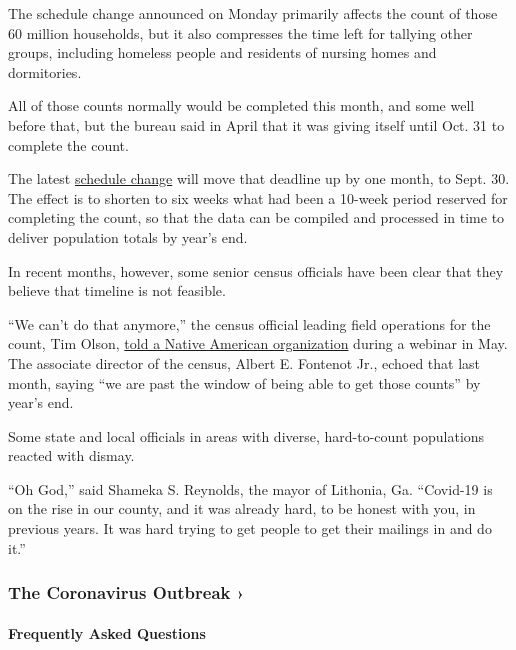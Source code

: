 The schedule change announced on Monday primarily affects the count of
those 60 million households, but it also compresses the time left for
tallying other groups, including homeless people and residents of
nursing homes and dormitories.

All of those counts normally would be completed this month, and some
well before that, but the bureau said in April that it was giving itself
until Oct. 31 to complete the count.

The latest
\href{https://www.nytimes.com/2020/07/28/us/trump-census.html}{schedule
change} will move that deadline up by one month, to Sept. 30. The effect
is to shorten to six weeks what had been a 10-week period reserved for
completing the count, so that the data can be compiled and processed in
time to deliver population totals by year's end.

In recent months, however, some senior census officials have been clear
that they believe that timeline is not feasible.

``We can't do that anymore,'' the census official leading field
operations for the count, Tim Olson,
\href{https://www.youtube.com/watch?v=F6IyJMtDDgY\&feature=youtu.be\&t=4688}{told
a Native American organization} during a webinar in May. The associate
director of the census, Albert E. Fontenot Jr., echoed that last month,
saying ``we are past the window of being able to get those counts'' by
year's end.

Some state and local officials in areas with diverse, hard-to-count
populations reacted with dismay.

``Oh God,'' said Shameka S. Reynolds, the mayor of Lithonia, Ga.
``Covid-19 is on the rise in our county, and it was already hard, to be
honest with you, in previous years. It was hard trying to get people to
get their mailings in and do it.''

\href{https://www.nytimes.com/news-event/coronavirus?action=click\&pgtype=Article\&state=default\&region=MAIN_CONTENT_3\&context=storylines_faq}{}

\hypertarget{the-coronavirus-outbreak-}{%
\subsubsection{The Coronavirus Outbreak
›}\label{the-coronavirus-outbreak-}}

\hypertarget{frequently-asked-questions}{%
\paragraph{Frequently Asked
Questions}\label{frequently-asked-questions}}

